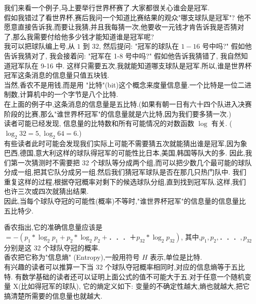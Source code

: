 \documentclass{article}
\begin{document}
我们来看一个例子,马上要举行世界杯赛了.大家都很关心谁会是冠军.\\
假如我错过了看世界杯,赛后我问一个知道比赛结果的观众"哪支球队是冠军"? 
他不愿意直接告诉我,而要让我猜,并且我每猜一次,他要收一元钱才肯告诉我是否猜对了,那么我需要付给他多少钱才能知道谁是冠军呢? \\
我可以把球队编上号,从 $1$ 到 $32$, 然后提问: "冠军的球队在 $1-16$ 号中吗?" 假如他告诉我猜对了, 我会接着问: "冠军在 1-8 号中吗?" 假如他告诉我猜错了, 我自然知道冠军队在 9-16 中. 这样只需要五次,我就能知道哪支球队是冠军.所以,谁是世界杯冠军这条消息的信息量只值五块钱. \\
当然,香农不是用钱,而是用 "比特"(bit)这个概念来度量信息量.一个比特是一位二进制数,计算机中的一个字节是八个比特.\\

在上面的例子中,这条消息的信息量是五比特.(如果有朝一日有六十四个队进入决赛阶段的比赛,那么"谁世界杯冠军"的信息量就是六比特,因为我们要多猜一次.) \\
读者可能已经发现, 信息量的比特数和所有可能情况的对数函数 $\log$ 有关. ($\log_{2}32=5, \log_{2}64=6$.) \\
有些读者此时可能会发现我们实际上可能不需要猜五次就能猜出谁是冠军,因为象巴西,德国,意大利这样的球队得冠军的可能性比日本,美国,韩国等队大的多.
因此,我们第一次猜测时不需要把 32 个球队等分成两个组,而可以把少数几个最可能的球队分成一组,把其它队分成另一组.然后我们猜冠军球队是否在那几只热门队中.
我们重复这样的过程,根据夺冠概率对剩下的候选球队分组,直到找到冠军队.这样,我们也许三次或四次就猜出结果.\\
因此,当每个球队夺冠的可能性(概率)不等时,"谁世界杯冠军"的信息量的信息量比五比特少.

香农指出,它的准确信息量应该是 $= -(p_1*\log_{2}p_1 + p_2 * \log_{2}p_2 +　．．．　＋p_{32} *\log_{2}p_{32})$, 
其中,$p_1,p_2 ,　．．．,p_{32}$ 分别是这 32 个球队夺冠的概率.\\
香农把它称为"信息熵" (Entropy),一般用符号 $H$ 表示,单位是比特.\\
有兴趣的读者可以推算一下当 32 个球队夺冠概率相同时,对应的信息熵等于五比特.
有数学基础的读者还可以证明上面公式的值不可能大于五.对于任意一个随机变量 X(比如得冠军的球队),
它的熵定义如下: 变量的不确定性越大,熵也就越大,把它搞清楚所需要的信息量也就越大.
\end{document}
